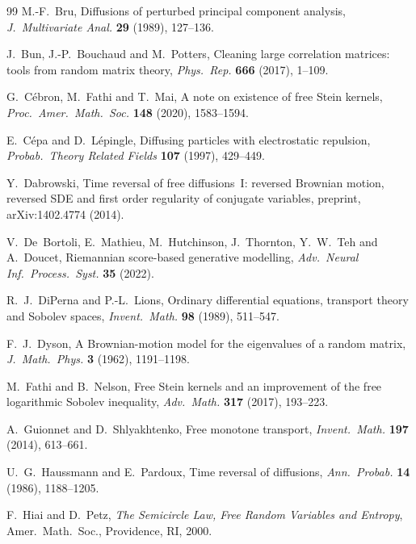 \documentclass[11pt]{article}
\theoremstyle{plain}
\theoremstyle{definition}
\theoremstyle{remark}
\begin{document}
\begin{singlespace}
\begin{thebibliography}{99}
M.-F.~Bru,
Diffusions of perturbed principal component analysis,
\emph{J.\ Multivariate Anal.} \textbf{29} (1989), 127--136.

J.~Bun, J.-P.~Bouchaud and M.~Potters,
Cleaning large correlation matrices: tools from random matrix theory,
\emph{Phys.\ Rep.} \textbf{666} (2017), 1--109.

G.~C\'ebron, M.~Fathi and T.~Mai,
A note on existence of free Stein kernels,
\emph{Proc.\ Amer.\ Math.\ Soc.} \textbf{148} (2020), 1583--1594.

E.~C\'epa and D.~L\'epingle,
Diffusing particles with electrostatic repulsion,
\emph{Probab.\ Theory Related Fields} \textbf{107} (1997), 429--449.

Y.~Dabrowski,
Time reversal of free diffusions~I: reversed Brownian motion, reversed SDE and first
order regularity of conjugate variables, preprint, arXiv:1402.4774 (2014).

V.~De~Bortoli, E.~Mathieu, M.~Hutchinson, J.~Thornton, Y.~W.~Teh and A.~Doucet,
Riemannian score-based generative modelling,
\emph{Adv.\ Neural Inf.\ Process.\ Syst.} \textbf{35} (2022).

R.~J.~DiPerna and P.-L.~Lions,
Ordinary differential equations, transport theory and Sobolev spaces,
\emph{Invent.\ Math.} \textbf{98} (1989), 511--547.

F.~J.~Dyson,
A Brownian-motion model for the eigenvalues of a random matrix,
\emph{J.\ Math.\ Phys.} \textbf{3} (1962), 1191--1198.

M.~Fathi and B.~Nelson,
Free Stein kernels and an improvement of the free logarithmic Sobolev inequality,
\emph{Adv.\ Math.} \textbf{317} (2017), 193--223.

A.~Guionnet and D.~Shlyakhtenko,
Free monotone transport,
\emph{Invent.\ Math.} \textbf{197} (2014), 613--661.

U.~G.~Haussmann and E.~Pardoux,
Time reversal of diffusions,
\emph{Ann.\ Probab.} \textbf{14} (1986), 1188--1205.

F.~Hiai and D.~Petz,
\emph{The Semicircle Law, Free Random Variables and Entropy},
Amer.\ Math.\ Soc., Providence, RI, 2000.


\end{thebibliography}
\end{singlespace}
\end{document}
